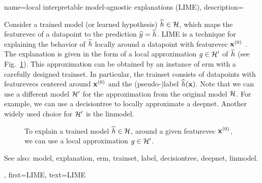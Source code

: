 {name={local interpretable model-agnostic explanations (LIME)},
	description={Consider 
		a trained \gls{model} (or learned \gls{hypothesis}) $\widehat{h} \in \mathcal{H}$, 
		which maps the \gls{featurevec} of a \gls{datapoint} to the \gls{prediction} $\widehat{y}= \widehat{h}$. 
		LIME is a technique for explaining the behavior of $\widehat{h}$ 
		locally around a \gls{datapoint} with \gls{featurevec} ${\bf x}^{(0)}$ \cite{Ribeiro2016}. 
		The \gls{explanation} is given in the form of a local approximation $g \in \mathcal{H}'$ of $\widehat{h}$ 
		(see Fig.\ \ref{fig_lime_dict}). This approximation can be obtained by an instance of \gls{erm} 
		with a carefully designed \gls{trainset}. In particular, the \gls{trainset} consists of \glspl{datapoint} with 
		\glspl{featurevec} centered around ${\bf x}^{(0)}$ and the (pseudo-)\gls{label} $\widehat{h}({\bf x})$. 
		Note that we can use a different \gls{model} $\mathcal{H}'$ for the approximation from 
		the original \gls{model} $\mathcal{H}$. For example, we can use a \gls{decisiontree} 
		to locally approximate a \gls{deepnet}. Another widely used choice for $\mathcal{H}'$ is 
		the \gls{linmodel}. 
		\begin{figure}[H]
		\begin{center}
		\end{center}
		\caption{To explain a trained \gls{model} $\widehat{h} \in \mathcal{H}$, around a 
			given \gls{featurevec} ${\bf x}^{(0)}$, we can use a local approximation $g \in \mathcal{H}'$. }
			\label{fig_lime_dict}
		\end{figure}
		See also: \gls{model}, \gls{explanation}, \gls{erm}, \gls{trainset}, \gls{label}, \gls{decisiontree}, \gls{deepnet}, \gls{linmodel}.},
	first={LIME},
	text={LIME}
}

